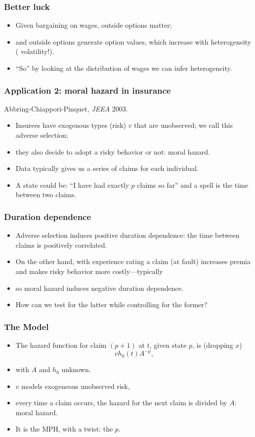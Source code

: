 \documentclass[aspectratio=169]{beamer}
\begin{document}
\begin{frame}
\frametitle{Better luck}
\begin{itemize}
\item Given bargaining on wages, outside options matter;
\item and outside options generate option values, which increase with heterogeneity ( volatility!).
\item ``So'' by looking at the distribution of wages we can infer heterogeneity.
\end{itemize}
\end{frame}



\begin{frame}
\frametitle{Application 2: moral hazard in insurance}
Abbring-Chiappori-Pinquet, {\em JEEA\/} 2003.
\begin{itemize}
\item Insurees have exogenous  types (risk) $v$ that are unobserved; we call this adverse selection;
\item they also decide to adopt a risky behavior or not: \alert{moral hazard}.
\item Data typically gives us a series of claims for each individual. 
\item A state could be: ``I have had exactly $p$ claims so far'' and a spell is the time between two claims.
\end{itemize}
\end{frame}


\begin{frame}
\frametitle{Duration dependence}
\begin{itemize}
\item Adverse selection induces positive duration dependence: the time between claims is positively correlated.
\item On the other hand, with experience rating a claim (at fault) increases premia and makes risky behavior more costly---typically
\item so moral hazard induces negative duration dependence.
\item How can we test for the latter while controlling for the former?
\end{itemize}
\end{frame}


\begin{frame}
\frametitle{The Model}
\begin{itemize}
\item The hazard function for claim $(p+1)$ at $t$, given state $p$, is (dropping $x$)
\[
v h_0(t) A^{-p},
\]
\item  with $A$ and $h_0$ unknown. 
\item $v$ models exogeneous unobserved risk, 
\item every time a claim occurs, the hazard for the next claim is divided by  $A$: moral hazard.
\item It is the MPH, with a twist: the $p$.
\end{itemize}
\end{frame}
\end{document}
